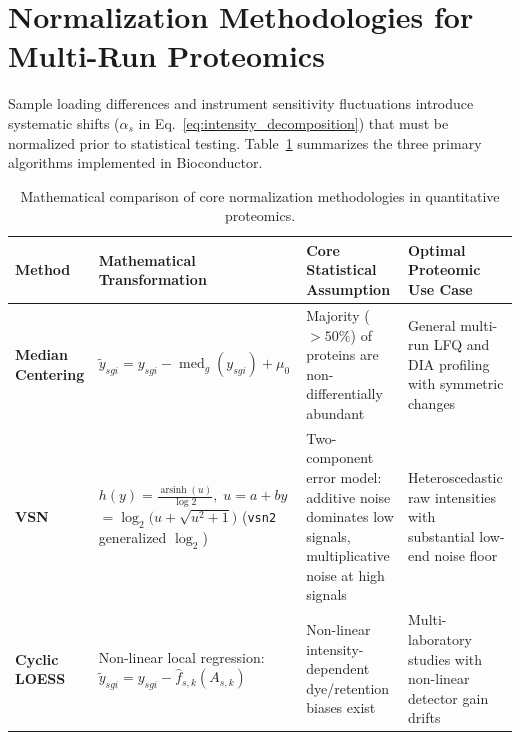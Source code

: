 \documentclass[11pt,oneside]{book}
\begin{document}
\section{Normalization Methodologies for Multi-Run Proteomics}

Sample loading differences and instrument sensitivity fluctuations introduce systematic shifts ($\alpha_s$ in Eq.~\ref{eq:intensity_decomposition}) that must be normalized prior to statistical testing. Table~\ref{tab:norm_comparison} summarizes the three primary algorithms implemented in Bioconductor.

\begin{table}[htbp]
\centering
\small
\caption{Mathematical comparison of core normalization methodologies in quantitative proteomics.}
\label{tab:norm_comparison}
\begin{tabularx}{\textwidth}{l p{4.0cm} p{3.6cm} X}
\toprule
\textbf{Method} & \textbf{Mathematical Transformation} & \textbf{Core Statistical Assumption} & \textbf{Optimal Proteomic Use Case} \\
\midrule
\textbf{Median Centering} & $\tilde{y}_{sgi} = y_{sgi} - \operatorname{med}_g(y_{sgi}) + \mu_0$ & Majority ($>50\%$) of proteins are non-differentially abundant & General multi-run LFQ and DIA profiling with symmetric changes \cite{callister2006normalization} \\
\addlinespace
\textbf{VSN} & $h(y) = \frac{\operatorname{arsinh}(u)}{\log 2}, \; u = a + by$ \newline $= \log_2\bigl(u + \sqrt{u^2 + 1}\bigr)$ \newline (\texttt{vsn2} generalized $\log_2$) & Two-component error model: additive noise dominates low signals, multiplicative noise at high signals \cite{huber2002variance} & Heteroscedastic raw intensities with substantial low-end noise floor \cite{huber2002variance} \\
\addlinespace
\textbf{Cyclic LOESS} & Non-linear local regression: \newline $\tilde{y}_{sgi} = y_{sgi} - \hat{f}_{s,k}(A_{s,k})$ & Non-linear intensity-dependent dye/retention biases exist & Multi-laboratory studies with non-linear detector gain drifts \cite{bolstad2003comparison} \\
\bottomrule
\end{tabularx}
\end{table}
\end{document}
